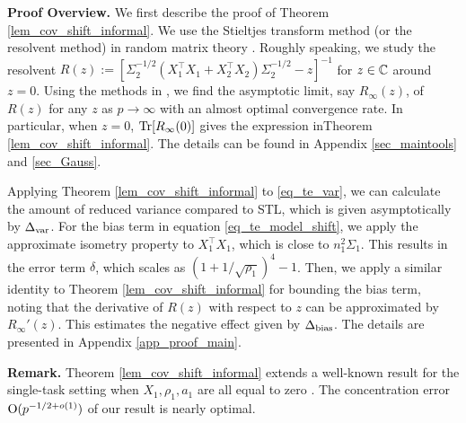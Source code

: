 \textbf{Proof Overview.} We first describe the proof of Theorem \ref{lem_cov_shift_informal}.
We use the Stieltjes transform method (or the resolvent method) in random matrix theory \cite{bai2009spectral,tao2012topics,erdos2017dynamical}. Roughly speaking, we study the resolvent $R(z):=[\Sigma_2^{-1/2}( X_1^{\top}X_1 + X_2^{\top}X_2)\Sigma_2^{-1/2}-z]^{-1}$ for $z\in \mathbb{C}$ around $z=0$.
Using the methods in \cite{Anisotropic,yang2019spiked}, we find the asymptotic limit, say $R_\infty(z)$, of $R(z)$ for any $z$ as $p\to \infty$ with an almost optimal convergence rate. In particular, when $z=0$, $\operatorname{Tr}[R_\infty(0)]$ gives the expression inTheorem \ref{lem_cov_shift_informal}. The details can be found in Appendix \ref{sec_maintools} and \ref{sec_Gauss}.

Applying Theorem \ref{lem_cov_shift_informal} to \eqref{eq_te_var}, we can calculate the amount of reduced variance compared to STL, which is given asymptotically by $\Delta_{\text{var}}$.
For the bias term in equation \eqref{eq_te_model_shift}, we apply the approximate isometry property to $X_1^{\top}X_1$, which is close to $n_1^2\Sigma_1$. This results in the error term $\delta$, which scales as $(1 + 1/\sqrt{\rho_1})^4-1$.
Then, we apply a similar identity to Theorem \ref{lem_cov_shift_informal} for bounding the bias term, noting that the derivative of $R(z)$ with respect to $z$ can be approximated by $R_\infty'(z)$.
This estimates the negative effect given by $\Delta_{\text{bias}}$. %
The details are presented in Appendix \ref{app_proof_main}.


\textbf{Remark.} Theorem \ref{lem_cov_shift_informal} extends a well-known result for the single-task setting when $X_1, \rho_1, a_1$ are all equal to zero \cite{S07}.
The concentration error $\operatorname{O}(p^{-1/2+o(1)})$ of our result is nearly optimal.


